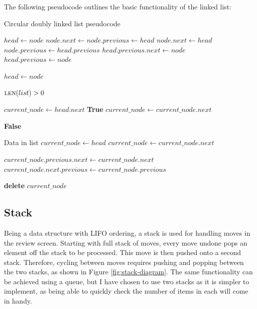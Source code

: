 \documentclass[../main/main.tex]{subfiles}
\begin{document}
The following pseudocode outlines the basic functionality of the linked list:

\begin{algorithm}[H]
\caption{Circular doubly linked list pseudocode}
\begin{algorithmic}
            \State $head \gets node$
            \State $node.next \gets node.previous \gets head$
        \Else
            \State $node.next \gets head$
            \State $node.previous \gets head.previous$
            \State $head.previous.next \gets node$
            \State $head.previous \gets node$

            \bigskip

            \State $head \gets node$
        \EndIf
    \EndFunction

    \bigskip

    \State \Require $\Call{len}{list} > 0$

        \State $current\_node \gets head.next$
                \State \Return \textbf{True}
            \EndIf
            \State $current\_node \gets current\_node.next$
        \EndWhile

        \State \Return \textbf{False}
    \EndFunction

    \bigskip

    \State \Require Data in list
        \State $current\_node \gets head$
            \State $current\_node \gets current\_node.next$
        \EndWhile

        \bigskip

        \State $current\_node.previous.next \gets current\_node.next$
        \State $current\_node.next.previous \gets current\_node.previous$

        \bigskip

        \State \textbf{delete} $current\_node$
    \EndFunction
\end{algorithmic}
\end{algorithm}

\subsection{Stack}
\label{sec:design-stack}
Being a data structure with LIFO ordering, a stack is used for handling moves in the review screen. Starting with full stack of moves, every move undone pops an element off the stack to be processed. This move is then pushed onto a second stack. Therefore, cycling between moves requires pushing and popping between the two stacks, as shown in Figure \ref{fig:stack-diagram}. The same functionality can be achieved using a queue, but I have chosen to use two stacks as it is simpler to implement, as being able to quickly check the number of items in each will come in handy.
\end{document}

